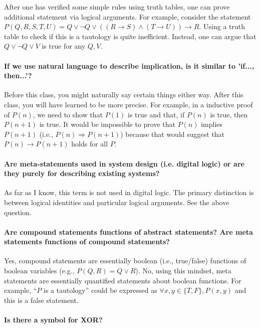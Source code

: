 \documentclass[10pt,english]{article}
\begin{document}
After one has verified some simple rules using truth tables, one can prove additional statement via logical arguments.  For example, consider the statement $P(Q,R,S,T,U) = Q \vee \neg Q \vee ( (R \to S) \wedge (T \to U) ) \to R$.
Using a truth table to check if this is a tautology is quite inefficient.  Instead, one can argue that $Q \vee \neg Q \vee V$ is true for any $Q,V$.

\paragraph{If we use natural language to describe implication, is it similar to 'if..., then...'?}

Before this class, you might naturally say certain things either way.  After this class, you will have learned to be more precise.  For example, in a inductive proof of $P(n)$, we need to show that $P(1)$ is true and that, if $P(n)$ is true, then $P(n+1)$ is true.  It would be impossible to prove that $P(n)$ implies $P(n+1)$ (i.e., $P(n) \Rightarrow P(n+1)$) because that would suggest that $P(n) \rightarrow P(n+1)$ holds for all $P$.

\paragraph{Are meta-statements used in system design (i.e. digital logic) or are they purely for describing existing systems?}

As far as I know, this term is not used in digital logic.  The primary  distinction is between logical identities and particular logical arguments.  See the above question.

\paragraph{Are compound statements functions of abstract statements? Are meta statements functions of compound statements?}

Yes, compound statements are essentially boolean (i.e., true/false) functions of boolean variables (e.g., $P(Q,R) = Q \vee R$). No, using this mindset, meta statements are essentially quantified statements about boolean functions.  For example, ``$P$ is a tautology'' could be expressed as $\forall x,y\in \{T,F\}, P(x,y)$ and this is a false statement.

\paragraph{Is there a symbol for XOR?}
\end{document}
